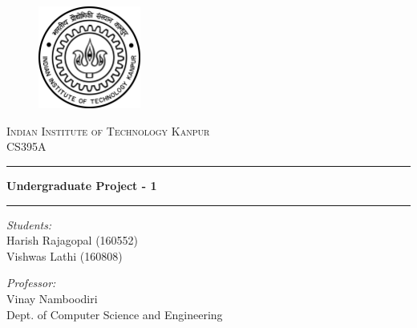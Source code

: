 \documentclass[12pt,a4paper,twocolumn]{article}
\begin{document}
    \begin{titlepage}
        \centering

        \vspace*{2cm}
        \begin{figure}[h]
            \centering
            \includegraphics[width=0.3\textwidth]{iitk-logo.png}\\[15mm]
        \end{figure}
        \textsc{\LARGE Indian Institute of Technology Kanpur}\\[1cm]
        {\Large CS395A}\\[7mm]

        \hrule
        \vspace{3mm}
        \textbf{\Large Undergraduate Project - 1}\\[5mm]
        \hrule
        \vspace{3mm}

        \begin{multicols}{2}
            \textit{Students:}\\[2mm]
            Harish Rajagopal (160552)\\
            Vishwas Lathi (160808)\\

            \vfill\null\columnbreak

            \textit{Professor:}\\[2mm]
            Vinay Namboodiri\\
            Dept. of Computer Science and Engineering
        \end{multicols}
    \end{titlepage}

\end{document}
